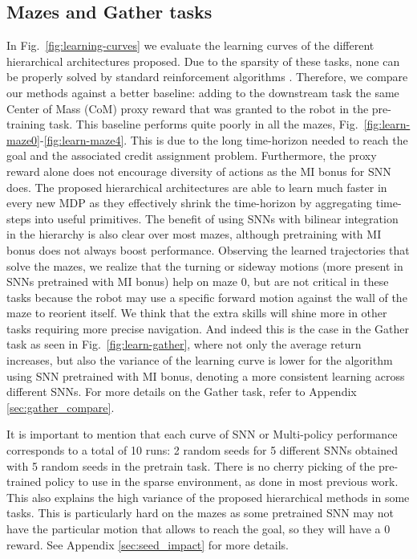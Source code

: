 \documentclass{article} %
\begin{document}
\subsection{Mazes and Gather tasks}
In Fig.\ \ref{fig:learning-curves} we evaluate the learning curves of the different hierarchical architectures proposed. Due to the sparsity of these tasks, none can be properly solved by standard reinforcement algorithms \citep{duan2016benchmarking}. Therefore, we compare our methods against a better baseline: adding to the downstream task the same Center of Mass (CoM) proxy reward that was granted to the robot in the pre-training task. This baseline performs quite poorly in all the mazes, Fig.\ \ref{fig:learn-maze0}-\ref{fig:learn-maze4}. This is due to the long time-horizon needed to reach the goal and the associated credit assignment problem. Furthermore, the proxy reward alone does not encourage diversity of actions as the MI bonus for SNN does. 
The proposed hierarchical architectures are able to learn much faster in every new MDP as they effectively shrink the time-horizon by aggregating time-steps into useful primitives. The benefit of using SNNs with bilinear integration in the hierarchy is also clear over most mazes, although pretraining with MI bonus does not always boost performance. Observing the learned trajectories that solve the mazes, we realize that the turning or sideway motions (more present in SNNs pretrained with MI bonus) help on maze 0, but are not critical in these tasks because the robot may use a specific forward motion against the wall of the maze to reorient itself. We think that the extra skills will shine more in other tasks requiring more precise navigation. And indeed this is the case in the Gather task as seen in Fig.\ \ref{fig:learn-gather}, where not only the average return increases, but also the variance of the learning curve is lower for the algorithm using SNN pretrained with MI bonus, denoting a more consistent learning across different SNNs. For more details on the Gather task, refer to Appendix \ref{sec:gather_compare}.

It is important to mention that each curve of SNN or Multi-policy performance corresponds to a total of 10 runs: 2 random seeds for 5 different SNNs obtained with 5 random seeds in the pretrain task. There is no cherry picking of the pre-trained policy to use in the sparse environment, as done in most previous work. This also explains the high variance of the proposed hierarchical methods in some tasks. This is particularly hard on the mazes as some pretrained SNN may not have the particular motion that allows to reach the goal, so they will have a 0 reward. See Appendix \ref{sec:seed_impact} for more details.
\end{document}
